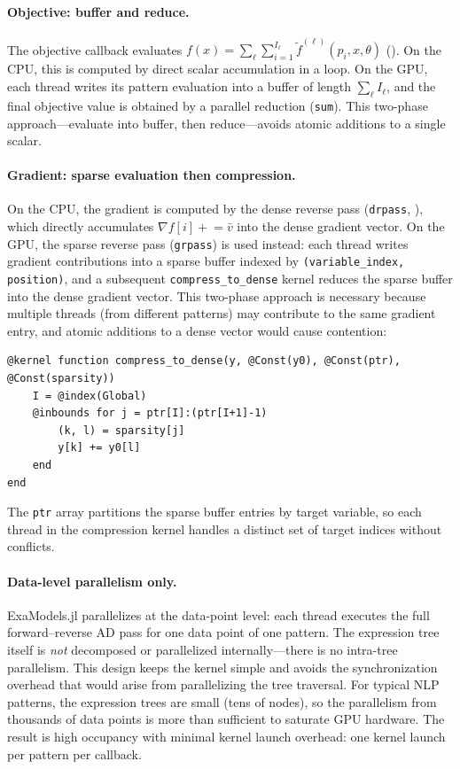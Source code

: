 \documentclass[11pt]{article}
\begin{document}
\paragraph{Objective: buffer and reduce.}
The objective callback evaluates $f(x) = \sum_\ell \sum_{i=1}^{I_\ell} \tilde{f}^{(\ell)}(p_i, x, \theta)$ (). On the CPU, this is computed by direct scalar accumulation in a loop. On the GPU, each thread writes its pattern evaluation into a buffer of length $\sum_\ell I_\ell$, and the final objective value is obtained by a parallel reduction (\texttt{sum}). This two-phase approach---evaluate into buffer, then reduce---avoids atomic additions to a single scalar.

\paragraph{Gradient: sparse evaluation then compression.}
On the CPU, the gradient is computed by the dense reverse pass (\texttt{drpass}, ), which directly accumulates $\nabla f[i] \mathrel{+}= \bar{v}$ into the dense gradient vector. On the GPU, the sparse reverse pass (\texttt{grpass}) is used instead: each thread writes gradient contributions into a sparse buffer indexed by \texttt{(variable\_index, position)}, and a subsequent \texttt{compress\_to\_dense} kernel reduces the sparse buffer into the dense gradient vector. This two-phase approach is necessary because multiple threads (from different patterns) may contribute to the same gradient entry, and atomic additions to a dense vector would cause contention:
\begin{lstlisting}
@kernel function compress_to_dense(y, @Const(y0), @Const(ptr), @Const(sparsity))
    I = @index(Global)
    @inbounds for j = ptr[I]:(ptr[I+1]-1)
        (k, l) = sparsity[j]
        y[k] += y0[l]
    end
end
\end{lstlisting}
The \texttt{ptr} array partitions the sparse buffer entries by target variable, so each thread in the compression kernel handles a distinct set of target indices without conflicts.

\paragraph{Data-level parallelism only.}
ExaModels.jl parallelizes at the data-point level: each thread executes the full forward--reverse AD pass for one data point of one pattern. The expression tree itself is \emph{not} decomposed or parallelized internally---there is no intra-tree parallelism. This design keeps the kernel simple and avoids the synchronization overhead that would arise from parallelizing the tree traversal. For typical NLP patterns, the expression trees are small (tens of nodes), so the parallelism from thousands of data points is more than sufficient to saturate GPU hardware. The result is high occupancy with minimal kernel launch overhead: one kernel launch per pattern per callback.
\end{document}
